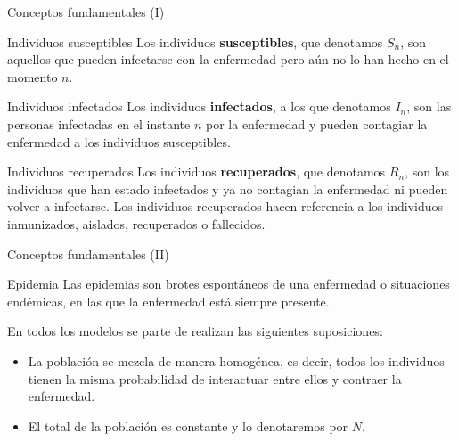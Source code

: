 




\begin{frame}{Conceptos fundamentales (I)}

    \begin{block}{Individuos susceptibles}
        Los individuos \textbf{susceptibles}, que denotamos $S_n$, son aquellos que pueden infectarse con la enfermedad pero aún no lo han hecho en el momento $n$.
    \end{block}  

    \pause

    \begin{block}{Individuos infectados}
        Los individuos \textbf{infectados}, a los que denotamos $I_n$, son las personas infectadas en el instante $n$ por la enfermedad y pueden contagiar la enfermedad a los individuos susceptibles.
    \end{block}  

    \pause

    \begin{block}{Individuos recuperados}
        Los individuos \textbf{recuperados}, que denotamos $R_n$, son los individuos que han estado infectados y ya no contagian la enfermedad ni pueden volver a infectarse.
        Los individuos recuperados hacen referencia a los individuos inmunizados, aislados, recuperados o fallecidos.
    \end{block}  


\end{frame}


\begin{frame}{Conceptos fundamentales (II)}

    \begin{block}{Epidemia}
        Las epidemias son brotes espontáneos de una enfermedad o situaciones endémicas, en las que la enfermedad está siempre presente.
    \end{block}  

    \pause

    En todos los modelos se parte de realizan las siguientes suposiciones:

    \begin{itemize}
        \item La población se mezcla de manera homogénea, es decir, todos los individuos tienen la misma probabilidad de interactuar entre ellos y contraer la enfermedad.
        \item El total de la población es constante y lo denotaremos por $N$.
    \end{itemize}

\end{frame}


